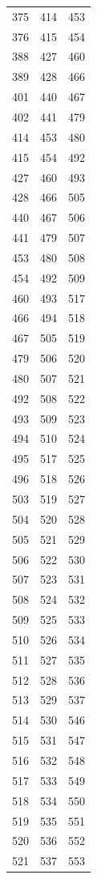 \begin{tabular}{rrr}
  375 & 414 & 453 \\
  376 & 415 & 454 \\
  388 & 427 & 460 \\
  389 & 428 & 466 \\
  401 & 440 & 467 \\
  402 & 441 & 479 \\
  414 & 453 & 480 \\
  415 & 454 & 492 \\
  427 & 460 & 493 \\
  428 & 466 & 505 \\
  440 & 467 & 506 \\
  441 & 479 & 507 \\
  453 & 480 & 508 \\
  454 & 492 & 509 \\
  460 & 493 & 517 \\
  466 & 494 & 518 \\
  467 & 505 & 519 \\
  479 & 506 & 520 \\
  480 & 507 & 521 \\
  492 & 508 & 522 \\
  493 & 509 & 523 \\
  494 & 510 & 524 \\
  495 & 517 & 525 \\
  496 & 518 & 526 \\
  503 & 519 & 527 \\
  504 & 520 & 528 \\
  505 & 521 & 529 \\
  506 & 522 & 530 \\
  507 & 523 & 531 \\
  508 & 524 & 532 \\
  509 & 525 & 533 \\
  510 & 526 & 534 \\
  511 & 527 & 535 \\
  512 & 528 & 536 \\
  513 & 529 & 537 \\
  514 & 530 & 546 \\
  515 & 531 & 547 \\
  516 & 532 & 548 \\
  517 & 533 & 549 \\
  518 & 534 & 550 \\
  519 & 535 & 551 \\
  520 & 536 & 552 \\
  521 & 537 & 553 \\

\end{tabular}
